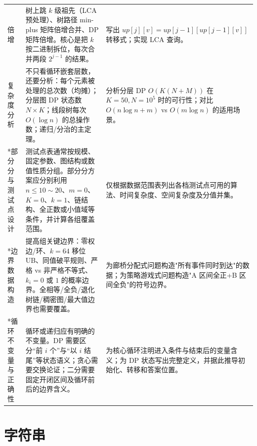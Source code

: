 \documentclass[a4paper,11pt]{article}
\begin{document}
\begin{longtable}{L{2.4cm} L{7.5cm} L{6.8cm}}
倍增
& 树上跳 $k$ 级祖先（LCA 预处理）、树路径 min-plus 矩阵倍增合并、DP 矩阵倍增。核心是把 $k$ 按二进制拆位，每次合并两段 $2^{j-1}$ 的结果。
& 写出 $up[j][v]=up[j-1][up[j-1][v]]$ 转移式；实现 LCA 查询。\\[2mm]

复杂度分析
& 不只看循环嵌套层数，还要分析：每个元素被处理的总次数（均摊）；分层图 DP 状态数 $N\times K$；线段树每次 $O(\log n)$ 的总操作数；递归/分治的主定理。
& 分析分层 DP $O(K(N+M))$ 在 $K=50,N=10^5$ 时的可行性；对比 $O(n\log n+m)$ vs $O(m\log n)$ 的适用场景。\\[2mm]

*部分分与测试点设计
& 测试点表通常按规模、固定参数、图结构或数值性质分组。部分分方案应分别利用 $n\le10\sim20$、$m=0$、$K=0$、$k=1$、链结构、全正数或小值域等条件，并计算各组覆盖范围。
& 仅根据数据范围表列出各档测试点可用的算法、时间复杂度、空间复杂度及分值并集。\\[2mm]

*边界数据构造
& 提高组关键边界：零权边/环、$k=64$ 移位 UB、同值破平规则、严格 vs 非严格不等式、$k_i=0$ 或 $1$ 的概率边界。全相等/全负/退化树链/稠密图/最大值边界也需要覆盖。
& 为廊桥分配式问题构造"所有事件同时到达"的数据；为策略游戏式问题构造"A 区间全正+B 区间全负"的符号边界。\\[2mm]
*循环不变量与正确性
& 循环或递归应有明确的不变量。DP 需要区分“前 $i$ 个”与“以 $i$ 结尾”等状态语义；贪心需要交换论证；二分需要固定开闭区间及循环前后的边界含义。
& 为核心循环注明进入条件与结束后的变量含义；为 DP 状态写出完整定义，并据此推导初始化、转移和答案位置。\\[2mm]
\end{longtable}

\newpage
\section{字符串}
\end{document}
